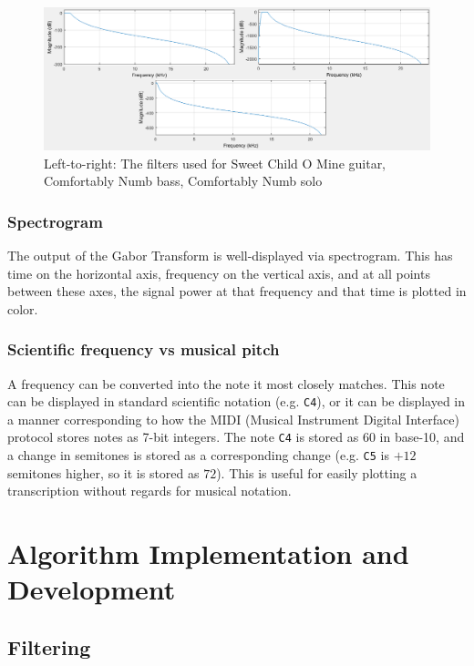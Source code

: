 \documentclass{article}
\begin{document}
\begin{figure}[!t]
	\centering
	\includegraphics[width=\linewidth]{figs/filters}    	
	\caption{Left-to-right: The filters used for Sweet Child O Mine guitar, Comfortably Numb bass, Comfortably Numb solo}
	\label{fig:filters}
\end{figure}

\subsubsection{Spectrogram}

The output of the Gabor Transform is well-displayed via spectrogram. This has time on the horizontal axis, frequency on the vertical axis, and at all points between these axes, the signal power at that frequency and that time is plotted in color.

\subsubsection{Scientific frequency vs musical pitch}
A frequency can be converted into the note it most closely matches. This note can be displayed in standard scientific notation (e.g. \texttt{C4}), or it can be displayed in a manner corresponding to how the MIDI (Musical Instrument Digital Interface) protocol stores notes as 7-bit integers. The note \texttt{C4} is stored as $60$ in base-10, and a change in semitones is stored as a corresponding change (e.g. \texttt{C5} is $+12$ semitones higher, so it is stored as $72$). This is useful for easily plotting a transcription without regards for musical notation.


\section{Algorithm Implementation and Development}


\subsection{Filtering}
\end{document}
